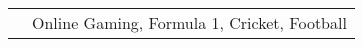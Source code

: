 \documentclass[letterpaper, 10pt]{article}
\begin{document}
\begin{longtable}{p{1.3in}p{4.8in}}





\nohyphens{\color{OliveGreen}{Other interests}} & Online Gaming, Formula 1, Cricket, Football\\


\end{longtable}
\end{document}
